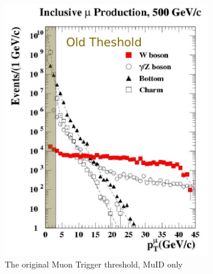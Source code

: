\begin{figure}[ht]
  \centering
  \begin{subfigure}[b]{0.5\textwidth}
    \centering
    \includegraphics[width=\textwidth]{./figures/w_old_trigger.png}
    \caption{The original Muon Trigger threshold, MuID only}
    \label{fig:trig_muon_old}
  \end{subfigure}%
  ~
  \begin{subfigure}[b]{0.5\textwidth}
    \centering

\end{subfigure}
\end{figure}
